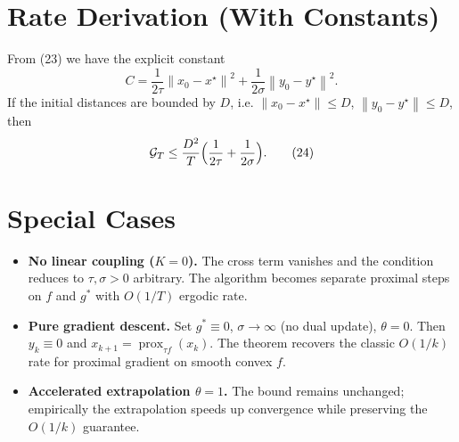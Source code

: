 \documentclass[11pt]{article}
\newcommand{\prox}{\operatorname{prox}}
\newcommand{\norm}[1]{\left\|#1\right\|}
\begin{document}
\section*{Rate Derivation (With Constants)}
From (23) we have the explicit constant
\[
C=\frac{1}{2\tau}\norm{x_0-x^{\star}}^{2}
   +\frac{1}{2\sigma}\norm{y_0-y^{\star}}^{2}.
\]
If the initial distances are bounded by $D$, i.e. $\norm{x_0-x^{\star}}\le D$, $\norm{y_0-y^{\star}}\le D$, then
\[
\mathcal{G}_T\le \frac{D^{2}}{T}\Bigl(\frac{1}{2\tau}+\frac{1}{2\sigma}\Bigr).
\tag{24}
\]

\section*{Special Cases}
\begin{itemize}[nosep]
\item \textbf{No linear coupling ($K=0$).} The cross term vanishes and the condition reduces to $\tau,\sigma>0$ arbitrary. The algorithm becomes separate proximal steps on $f$ and $g^{*}$ with $O(1/T)$ ergodic rate.
\item \textbf{Pure gradient descent.} Set $g^{*}\equiv0$, $\sigma\to\infty$ (no dual update), $\theta=0$. Then $y_{k}\equiv0$ and $x_{k+1}=\prox_{\tau f}(x_k)$. The theorem recovers the classic $O(1/k)$ rate for proximal gradient on smooth convex $f$.
\item \textbf{Accelerated extrapolation $\theta=1$.} The bound remains unchanged; empirically the extrapolation speeds up convergence while preserving the $O(1/k)$ guarantee.
\end{itemize}
\end{document}
